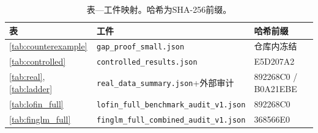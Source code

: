 \documentclass[10.5pt,a4paper]{ctexart}
\begin{document}
\begin{table}[H]\centering\small
\caption{表—工件映射。哈希为SHA-256前缀。}
\label{tab:hashes}
\begin{tabular}{lll}
\toprule
表 & 工件 & 哈希前缀\\
\midrule
\ref{tab:counterexample} & \texttt{gap\_proof\_small.json} & 仓库内冻结\\
\ref{tab:controlled} & \texttt{controlled\_results.json} & E5D207A2\\
\ref{tab:real}, \ref{tab:ladder} & \texttt{real\_data\_summary.json}+外部审计 & 892268C0 / B0A21EBE\\
\ref{tab:lofin_full} & \texttt{lofin\_full\_benchmark\_audit\_v1.json} & 892268C0\\
\ref{tab:finglm_full} & \texttt{finglm\_full\_combined\_audit\_v1.json} & 368566E0\\
\bottomrule
\end{tabular}
\end{table}
\end{document}
